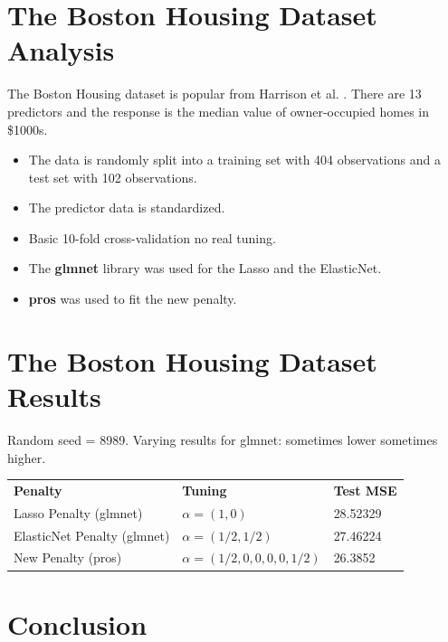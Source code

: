 \documentclass[10pt, reqno]{article}
\numberwithin{equation}{section}
\begin{document}
\newpage
\section*{The Boston Housing Dataset Analysis}

The Boston Housing dataset is popular from Harrison et al. \cite{boston_housing}.
There are 13 predictors and the response is the median value of owner-occupied homes in \$1000s.

\begin{itemize}
\item The data is randomly split into a training set with 404 observations and a test set with 102 observations.

\item The predictor data is standardized.

\item Basic 10-fold cross-validation no real tuning.

\item The \textbf{glmnet} \cite{glmnet} library was used for the Lasso and the ElasticNet.

\item \textbf{pros} \cite{pros} was used to fit the new penalty.
\end{itemize}

\newpage
\section*{The Boston Housing Dataset Results}

Random seed = 8989. Varying results for glmnet: sometimes lower sometimes higher.

\begin{center}
\begingroup
\setlength{\tabcolsep}{6pt} %
\renewcommand{\arraystretch}{2} %
\begin{tabular}{ l l l}
\textbf{Penalty} & \textbf{Tuning} & \textbf{Test MSE} \\
Lasso Penalty (glmnet) & $\alpha = (1, 0)$ & 28.52329 \\
ElasticNet Penalty (glmnet) & $\alpha = (1/2, 1/2)$  & 27.46224   \\
New Penalty (pros) & $\alpha = (1/2, 0, 0, 0, 0, 1/2)$ & 26.3852 \\
\end{tabular}
\endgroup
\end{center}

\newpage
\section*{Conclusion}
\end{document}
